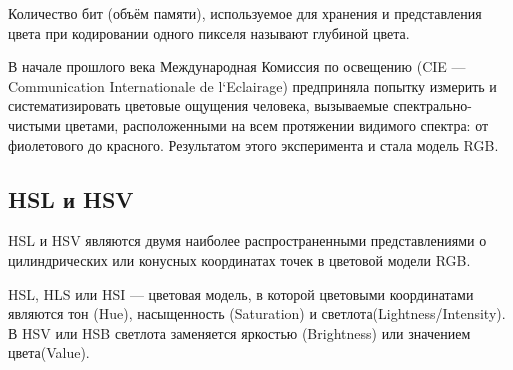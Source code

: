 Количество бит (объём памяти), используемое для хранения и представления цвета при кодировании одного пикселя называют глубиной цвета. 

В начале прошлого века Международная Комиссия по освещению (CIE —
Communication Internationale de l`Eclairage) предприняла попытку  измерить и систематизировать цветовые ощущения человека, вызываемые спектрально-чистыми
цветами, расположенными на всем протяжении видимого спектра: от фиолетового до
красного. Результатом этого эксперимента и стала модель RGB. 

\begin{figure}[ht!]
\end{figure}


\subsection{HSL и HSV}
HSL и HSV являются двумя наиболее распространенными представлениями о цилиндрических или конусных координатах точек в цветовой модели RGB. 

HSL, HLS или HSI  — цветовая модель, в которой цветовыми координатами являются тон (Hue), насыщенность (Saturation) и светлота(Lightness/Intensity). В HSV или HSB светлота заменяется яркостью (Brightness) или значением цвета(Value).

